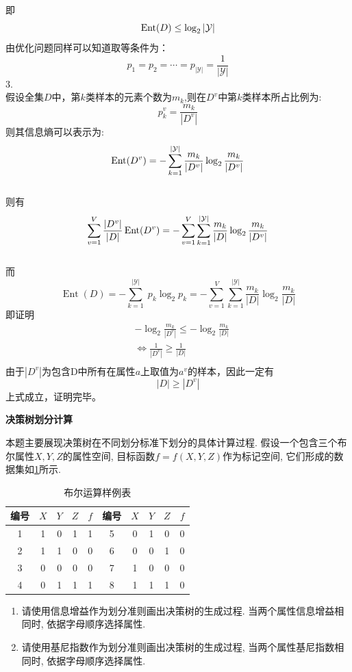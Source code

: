 \documentclass[answers]{exam}  %
\begin{document}
\begin{questions}
\begin{solution}
$$        $$
        即
        $$
        \operatornamewithlimits{Ent}(D)\le\log_2{|\mathcal Y|}
        $$
        由优化问题同样可以知道取等条件为：
        $$p_1=p_2=\cdots=p_{|\mathcal Y|}=\frac1{|\mathcal Y|}$$
        3.\\
        假设全集$D$中，第$k$类样本的元素个数为$m_k$,则在$D^v$中第$k$类样本所占比例为:
        $$p_k^v=\frac{m_k}{|D^v|}$$
        则其信息熵可以表示为:
        $$\operatornamewithlimits{Ent}(D^v)=-\sum^{|\mathcal Y|}_{k=1}\frac{m_k}{|D^v|}\log_2{\frac{m_k}{|D^v|}} $$\\
        则有
        $$\sum^V_{v=1}\frac{|D^v|}{|D|}\operatornamewithlimits{Ent}(D^v)=-\sum^V_{v=1}\sum^{|\mathcal Y|}_{k=1}\frac{m_k}{|D|}\log_2{\frac{m_k}{|D^v|}} $$\\
        而
        $$\operatorname{Ent}(D)=-\sum_{k=1}^{|\mathcal{Y}|}\; p_{k} \log_{2} p_{k}=-\sum^V_{v=1}\sum^{|\mathcal Y|}_{k=1}\frac{m_k}{|D|}\log_2\frac{m_k}{|D|} $$
        即证明
        $$\begin{aligned}
            &-\log_2{\frac{m_k}{|D^v|}}\le -\log_2{\frac{m_k}{|D|}}\\
            &\iff \frac1{|D^v|}\ge \frac1{|D|}\\
        \end{aligned}$$
        由于$|D^v|$为包含D中所有在属性$a$上取值为$a^v$的样本，因此一定有
        $$|D|\ge |D^v|$$
        上式成立，证明完毕。
    \end{solution}


\question [15] \textbf{决策树划分计算} \label{ch4_prob:get_tree}

本题主要展现决策树在不同划分标准下划分的具体计算过程. 假设一个包含三个布尔属性$X, Y, Z$的属性空间, 目标函数$f=f(X, Y, Z)$作为标记空间, 它们形成的数据集如\ref{ch4_tab:bool_table}所示. 
\begin{table}[ht]
    \centering
    \caption{布尔运算样例表}\label{ch4_tab:bool_table}
    \tabcolsep 15pt
    \begin{tabular}{cccc|c||cccc|c}
        \hline 
        编号 & $X$ & $Y$ & $Z$ & $f$ & 编号 & $X$ & $Y$ & $Z$ & $f$ \\
        \hline 1 & 1 & 0 & 1 & 1 & 5 & 0 & 1 & 0 & 0\\
        2 & 1 & 1 & 0 & 0 & 6 & 0 & 0 & 1 & 0 \\
        3 & 0 & 0 & 0 & 0 & 7 & 1 & 0 & 0 & 0\\
        4 & 0 & 1 & 1 & 1 & 8 & 1 & 1 & 1 & 0\\
        \hline
    \end{tabular}
\end{table}
\begin{enumerate}
    \item 请使用信息增益作为划分准则画出决策树的生成过程. 当两个属性信息增益相同时, 依据字母顺序选择属性. 
    \item 请使用基尼指数作为划分准则画出决策树的生成过程, 当两个属性基尼指数相同时, 依据字母顺序选择属性. 
\end{enumerate}
	

\end{questions}
\end{document}
